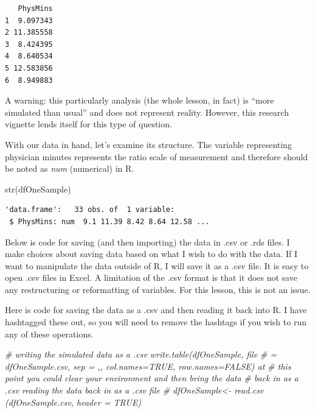 \documentclass[
  11pt,
]{book}
\newenvironment{Shaded}{\begin{snugshade}}{\end{snugshade}}
\newcommand{\CommentTok}[1]{\textcolor[rgb]{0.56,0.35,0.01}{\textit{#1}}}
\newcommand{\FunctionTok}[1]{\textcolor[rgb]{0.00,0.00,0.00}{#1}}
\newcommand{\NormalTok}[1]{#1}
\begin{document}
\begin{verbatim}
   PhysMins
1  9.097343
2 11.385558
3  8.424395
4  8.640534
5 12.583856
6  8.949883
\end{verbatim}

A warning: this particularly analysis (the whole lesson, in fact) is ``more simulated than usual'' and does not represent reality. However, this research vignette lends itself for this type of question.

With our data in hand, let's examine its structure. The variable representing physician minutes represents the ratio scale of measurement and therefore should be noted as \emph{num} (numerical) in R.

\begin{Shaded}
\begin{Highlighting}[]
\FunctionTok{str}\NormalTok{(dfOneSample)}
\end{Highlighting}
\end{Shaded}

\begin{verbatim}
'data.frame':   33 obs. of  1 variable:
 $ PhysMins: num  9.1 11.39 8.42 8.64 12.58 ...
\end{verbatim}

Below is code for saving (and then importing) the data in .csv or .rds files. I make choices about saving data based on what I wish to do with the data. If I want to manipulate the data outside of R, I will save it as a .csv file. It is easy to open .csv files in Excel. A limitation of the .csv format is that it does not save any restructuring or reformatting of variables. For this lesson, this is not an issue.

Here is code for saving the data as a .csv and then reading it back into R. I have hashtagged these out, so you will need to remove the hashtags if you wish to run any of these operations.

\begin{Shaded}
\begin{Highlighting}[]
\CommentTok{\# writing the simulated data as a .csv write.table(dfOneSample, file}
\CommentTok{\# = \textquotesingle{}dfOneSample.csv\textquotesingle{}, sep = \textquotesingle{},\textquotesingle{}, col.names=TRUE, row.names=FALSE) at}
\CommentTok{\# this point you could clear your environment and then bring the data}
\CommentTok{\# back in as a .csv reading the data back in as a .csv file}
\CommentTok{\# dfOneSample\textless{}{-} read.csv (\textquotesingle{}dfOneSample.csv\textquotesingle{}, header = TRUE)}
\end{Highlighting}
\end{Shaded}
\end{document}
